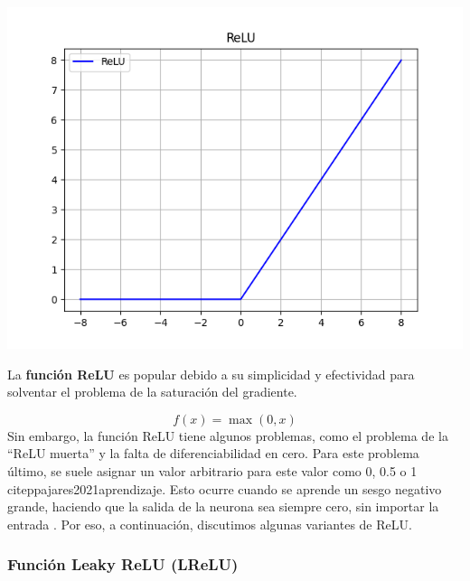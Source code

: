 \begin{minipage}{0.35\textwidth}
    \includegraphics[width=1.1\textwidth]{img/ReLU.png}
    \label{img: relu}
\end{minipage}
\begin{minipage}{0.05\textwidth}
\textbf{ }
\end{minipage}
\begin{minipage}{0.6\textwidth}
    La \textbf{función ReLU} es popular debido a su simplicidad y efectividad para solventar el problema de la saturación del gradiente.

\begin{equation}
    f(x) = \max(0, x)
\end{equation}
Sin embargo, la función ReLU tiene algunos problemas, como el problema de la ``ReLU muerta'' \citep{maas2013rectifier} y la falta de diferenciabilidad en cero. Para este problema último, se suele asignar un valor arbitrario para este valor como 0, 0.5 o 1 citep{pajares2021aprendizaje}. Esto ocurre cuando se aprende un sesgo negativo grande, haciendo que la salida de la neurona sea siempre cero, sin importar la entrada \citep{apicella2021survey}. Por eso, a continuación, discutimos algunas variantes de ReLU.
\end{minipage}


\subsubsection*{Función Leaky ReLU (LReLU)}

